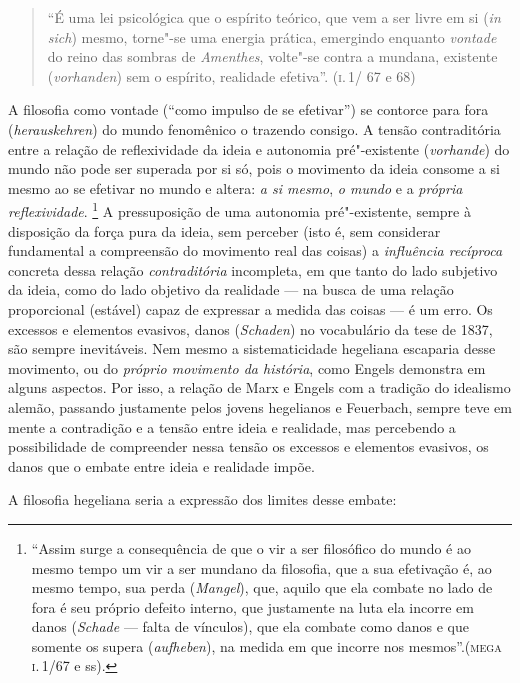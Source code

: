 \begin{quote}
``É uma lei psicológica que o espírito teórico, que vem a ser livre em
si (\emph{in sich}) mesmo, torne"-se uma energia prática, emergindo
enquanto \emph{vontade} do reino das sombras de \emph{Amenthes},
volte"-se contra a mundana, existente (\emph{vorhanden}) sem o espírito,
realidade efetiva''. (\textsc{i}.\,1/ 67 e 68)
\end{quote}

A filosofia como vontade (``como impulso de se efetivar'') se contorce
para fora (\emph{herauskehren}) do mundo fenomênico o trazendo consigo.
A tensão contraditória entre a relação de reflexividade da ideia e
autonomia pré"-existente (\emph{vorhande}) do mundo não pode ser superada
por si só, pois o movimento da ideia consome a si mesmo ao se efetivar
no mundo e altera: \emph{a si mesmo}, \emph{o mundo} e a \emph{própria
reflexividade}. \footnote{``Assim surge a consequência de que o vir a
  ser filosófico do mundo é ao mesmo tempo um vir a ser mundano da
  filosofia, que a sua efetivação é, ao mesmo tempo, sua perda
  (\emph{Mangel}), que, aquilo que ela combate no lado de fora é seu
  próprio defeito interno, que justamente na luta ela incorre em danos
  (\emph{Schade} --- falta de vínculos), que ela combate como danos e que
  somente os supera (\emph{aufheben}), na medida em que incorre nos
  mesmos''.(\textsc{mega} \textsc{i}.\,1/67 e ss).} A pressuposição de uma autonomia
pré"-existente, sempre à disposição da força pura da ideia, sem perceber
(isto é, sem considerar fundamental a compreensão do movimento real das
coisas) a \emph{influência recíproca} concreta dessa relação
\emph{contraditória} incompleta, em que tanto do lado subjetivo da
ideia, como do lado objetivo da realidade --- na busca de uma relação
proporcional (estável) capaz de expressar a medida das coisas --- é um
erro. Os excessos e elementos evasivos, danos (\emph{Schaden}) no
vocabulário da tese de 1837, são sempre inevitáveis. Nem mesmo a
sistematicidade hegeliana escaparia desse movimento, ou do \emph{próprio
movimento da história}, como Engels demonstra em alguns aspectos. Por
isso, a relação de Marx e Engels com a tradição do idealismo alemão,
passando justamente pelos jovens hegelianos e Feuerbach, sempre teve em
mente a contradição e a tensão entre ideia e realidade, mas percebendo a
possibilidade de compreender nessa tensão os excessos e elementos
evasivos, os danos que o embate entre ideia e realidade impõe.

A filosofia hegeliana seria a expressão dos limites desse embate:

